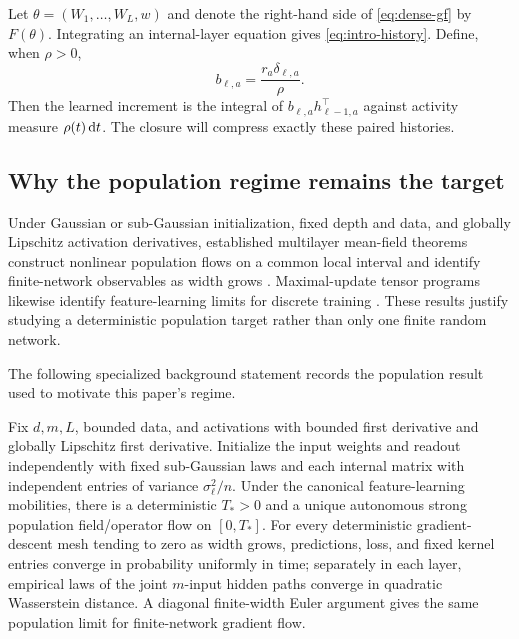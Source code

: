 Let $\theta=(W_1,\ldots,W_L,w)$ and denote the right-hand side of
\eqref{eq:dense-gf} by $F(\theta)$.  Integrating an internal-layer equation
gives \eqref{eq:intro-history}.  Define, when $\rho>0$,
\begin{equation}
 b_{\ell,a}=\frac{r_a\delta_{\ell,a}}{\rho}.
 \label{eq:b-definition}
\end{equation}
Then the learned increment is the integral of $b_{\ell,a}h_{\ell-1,a}^\top$
against activity measure $\rho(t)\mathop{}\!\mathrm d t$.  The closure will compress exactly
these paired histories.

\subsection{Why the population regime remains the target}

Under Gaussian or sub-Gaussian initialization, fixed depth and data, and
globally Lipschitz activation derivatives, established multilayer mean-field
theorems construct nonlinear population flows on a common local interval and
identify finite-network observables as width grows
\citep{nguyen2023rigorous}.  Maximal-update tensor programs likewise identify
feature-learning limits for discrete training \citep{yang2021tensor}.  These
results justify studying a deterministic population target rather than only
one finite random network.

The following specialized background statement records the population result
used to motivate this paper's regime.

\begin{proposition}
\label{prop:population-background}
Fix $d,m,L$, bounded data, and activations with bounded first derivative and
globally Lipschitz first derivative.  Initialize the input weights and readout
independently with fixed sub-Gaussian laws and each internal matrix with
independent entries of variance $\sigma_\ell^2/n$.  Under the canonical
feature-learning mobilities, there is a deterministic $T_*>0$ and a unique
autonomous strong population field/operator flow on $[0,T_*]$.  For every
deterministic gradient-descent mesh tending to zero as width grows,
predictions, loss, and fixed kernel entries converge in probability uniformly
in time; separately in each layer, empirical laws of the joint $m$-input
hidden paths converge in quadratic Wasserstein distance.  A diagonal
finite-width Euler argument gives the same population limit for finite-network
gradient flow.
\end{proposition}

